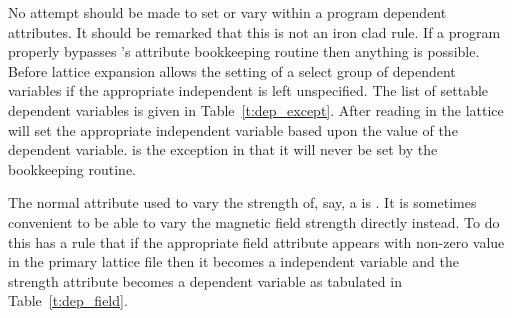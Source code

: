 No attempt should be made to set or vary within a program dependent
attributes. It should be remarked that this is not an iron clad rule.
If a program properly bypasses \bmad's attribute bookkeeping routine
then anything is possible. Before lattice expansion \bmad allows the
setting of a select group of dependent variables if the appropriate
independent is left unspecified.  The list of settable dependent
variables is given in Table~\ref{t:dep_except}.  After reading in the
lattice \bmad will set the appropriate independent variable based
upon the value of the dependent variable.  is the exception in 
that it will never be set by the bookkeeping routine.
\begin{table}[h]
\caption {Dependent variables that can be set in a primary lattice file.}
\label{t:dep_except}
\end{table}

The normal attribute used to vary the strength of, say, a
 is .  It is sometimes convenient to be able to
vary the magnetic field strength directly instead. To do this \bmad has
a rule that if the appropriate field attribute appears with non-zero value in the
primary lattice file then it becomes a independent variable and the strength attribute
becomes a dependent variable as tabulated in Table~\ref{t:dep_field}.
\begin{table}[h]
\caption {Field and Strength Attributes.}
\label{t:dep_field}
\end{table}

